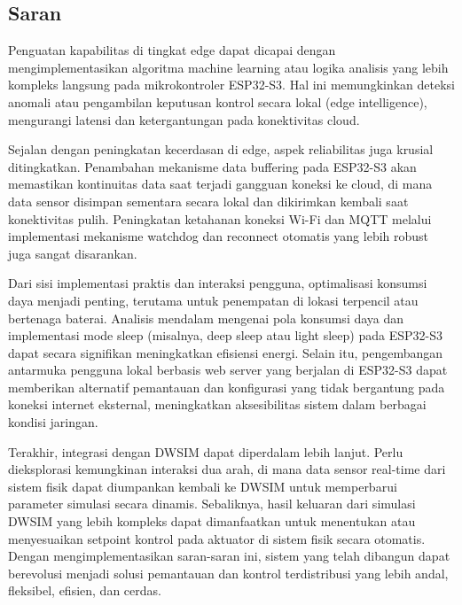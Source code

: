\documentclass[a4paper, 12pt]{article}
\begin{document}
\subsection{Saran}
Penguatan kapabilitas di tingkat edge dapat dicapai dengan mengimplementasikan algoritma machine learning atau logika analisis yang lebih kompleks langsung pada mikrokontroler ESP32-S3. Hal ini memungkinkan deteksi anomali atau pengambilan keputusan kontrol secara lokal (edge intelligence), mengurangi latensi dan ketergantungan pada konektivitas cloud.

Sejalan dengan peningkatan kecerdasan di edge, aspek reliabilitas juga krusial ditingkatkan. Penambahan mekanisme data buffering pada ESP32-S3 akan memastikan kontinuitas data saat terjadi gangguan koneksi ke cloud, di mana data sensor disimpan sementara secara lokal dan dikirimkan kembali saat konektivitas pulih. Peningkatan ketahanan koneksi Wi-Fi dan MQTT melalui implementasi mekanisme watchdog dan reconnect otomatis yang lebih robust juga sangat disarankan.

Dari sisi implementasi praktis dan interaksi pengguna, optimalisasi konsumsi daya menjadi penting, terutama untuk penempatan di lokasi terpencil atau bertenaga baterai. Analisis mendalam mengenai pola konsumsi daya dan implementasi mode sleep (misalnya, deep sleep atau light sleep) pada ESP32-S3 dapat secara signifikan meningkatkan efisiensi energi. Selain itu, pengembangan antarmuka pengguna lokal berbasis web server yang berjalan di ESP32-S3 dapat memberikan alternatif pemantauan dan konfigurasi yang tidak bergantung pada koneksi internet eksternal, meningkatkan aksesibilitas sistem dalam berbagai kondisi jaringan.

Terakhir, integrasi dengan DWSIM dapat diperdalam lebih lanjut. Perlu dieksplorasi kemungkinan interaksi dua arah, di mana data sensor real-time dari sistem fisik dapat diumpankan kembali ke DWSIM untuk memperbarui parameter simulasi secara dinamis. Sebaliknya, hasil keluaran dari simulasi DWSIM yang lebih kompleks dapat dimanfaatkan untuk menentukan atau menyesuaikan setpoint kontrol pada aktuator di sistem fisik secara otomatis. Dengan mengimplementasikan saran-saran ini, sistem yang telah dibangun dapat berevolusi menjadi solusi pemantauan dan kontrol terdistribusi yang lebih andal, fleksibel, efisien, dan cerdas.
\newpage
\end{document}

